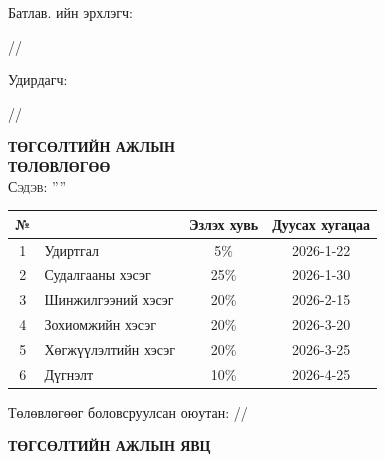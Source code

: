 
\begin{titlepage}

\vspace*{0.5cm}
Батлав. \deptname ийн эрхлэгч: 
\begin{flushright}
\makebox[2cm]{\dotfill} /\chairname/ 
\end{flushright}

Удирдагч: 
\begin{flushright}
\makebox[4cm]{\dotfill} /\supname/
\end{flushright}

\begin{center}

\vspace*{2cm}
\textbf{{\large ТӨГСӨЛТИЙН АЖЛЫН \\ ТӨЛӨВЛӨГӨӨ}}\\[0.5cm]

\textsc{\large Сэдэв: ''\ttitle''}\\[0.5cm]

\begin{tabular}{|c|p{7cm}|c|c|}
	\hline
	№ & \makebox[7cm][c]{Ажлын бүлэг, хэсгийн нэр} & Эзлэх хувь & Дуусах хугацаа \\ \hline
	1 & {Удиртгал}         &  5\% & 2026-1-22 \\ \hline
	2 & {Судалгааны хэсэг}     & 25\% & 2026-1-30 \\ \hline
	3 & {Шинжилгээний хэсэг} & 20\% & 2026-2-15 \\ \hline
	4 & {Зохиомжийн хэсэг}    & 20\% & 2026-3-20 \\ \hline
	5 & {Хөгжүүлэлтийн хэсэг}  & 20\% & 2026-3-25 \\ \hline
        6 & {Дүгнэлт}          & 10\% & 2026-4-25 \\ \hline
\end{tabular}

\vspace{2cm}
Төлөвлөгөөг боловсруулсан оюутан: \makebox[3cm]{\dotfill} /\shortname/

\end{center}

\newpage

\begin{center}

\vspace*{2cm}
\textbf{{\large ТӨГСӨЛТИЙН АЖЛЫН ЯВЦ}}\\[0.5cm]


\end{center}
\end{titlepage}

